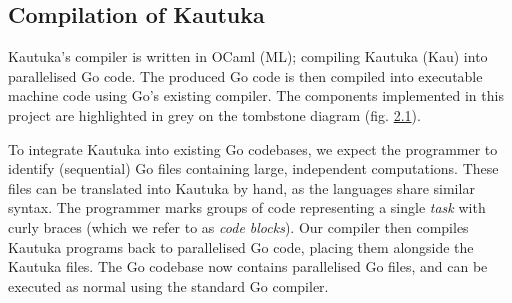 \subsection{Compilation of Kautuka}

\label{sec:2.1.1}

\noindent\begin{minipage}{.5\linewidth}

  Kautuka's compiler is written in OCaml (ML); compiling Kautuka (Kau) into parallelised Go code. The produced Go code is then compiled into executable machine code using Go's existing compiler. The components implemented in this project are highlighted in grey on the tombstone diagram (fig. \hyperref[fig:tombstone]{2.1}).

\end{minipage}%
\hspace{1.5mm}\begin{minipage}{.5\linewidth}
  \hspace{3mm}
  \vspace{-3mm}
  \label{fig:tombstone}
\end{minipage}

\vspace{2mm}

To integrate Kautuka into existing Go codebases, we expect the programmer to identify (sequential) Go files containing large, independent computations. These files can be translated into Kautuka by hand, as the languages share similar syntax. The programmer marks groups of code representing a single \textit{task} with curly braces (which we refer to as \textit{code blocks}). Our compiler then compiles Kautuka programs back to parallelised Go code, placing them alongside the Kautuka files. The Go codebase now contains parallelised Go files, and can be executed as normal using the standard Go compiler.

